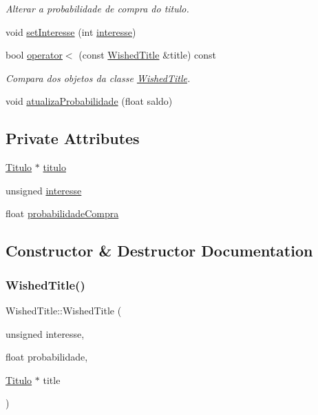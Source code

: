 \begin{DoxyCompactItemize}
\begin{DoxyCompactList}\small\item\em Alterar a probabilidade de compra do titulo. \end{DoxyCompactList}\item 
void \mbox{\hyperlink{class_wished_title_ae81814e2837a03f1bcbc1064da0e652e}{set\+Interesse}} (int \mbox{\hyperlink{class_wished_title_ae2a507c7b927da32f5e86c084ad56bda}{interesse}})
\item 
bool \mbox{\hyperlink{class_wished_title_a3acf82b03096f649740573441e1cb343}{operator$<$}} (const \mbox{\hyperlink{class_wished_title}{Wished\+Title}} \&title) const
\begin{DoxyCompactList}\small\item\em Compara dos objetos da classe \mbox{\hyperlink{class_wished_title}{Wished\+Title}}. \end{DoxyCompactList}\item 
void \mbox{\hyperlink{class_wished_title_a8be5446371add65ba4de2c69c84cb387}{atualiza\+Probabilidade}} (float saldo)
\end{DoxyCompactItemize}
\subsection*{Private Attributes}
\begin{DoxyCompactItemize}
\item 
\mbox{\hyperlink{class_titulo}{Titulo}} $\ast$ \mbox{\hyperlink{class_wished_title_afd2c4392f474c68763f1e81ee3c30120}{titulo}}
\item 
unsigned \mbox{\hyperlink{class_wished_title_ae2a507c7b927da32f5e86c084ad56bda}{interesse}}
\item 
float \mbox{\hyperlink{class_wished_title_a7d9e984289d16e68fd0a8a058a258586}{probabilidade\+Compra}}
\end{DoxyCompactItemize}


\subsection{Constructor \& Destructor Documentation}
\mbox{\label{class_wished_title_a27a60af16f94343ee502445e855a5659}} 
\subsubsection{\texorpdfstring{Wished\+Title()}{WishedTitle()}}
{\footnotesize\ttfamily Wished\+Title\+::\+Wished\+Title (\begin{DoxyParamCaption}\item[{unsigned}]{interesse,  }\item[{float}]{probabilidade,  }\item[{\mbox{\hyperlink{class_titulo}{Titulo}} $\ast$}]{title }\end{DoxyParamCaption})}



